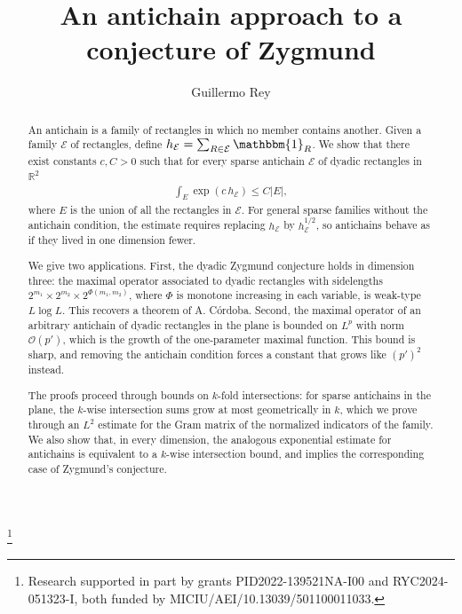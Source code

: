 \documentclass[oneside]{amsart}
\theoremstyle{definition}
\theoremstyle{plain}
\numberwithin{equation}{section}
\numberwithin{theorem}{section}
\newcommand{\ind}{\mathbbm{1}}
\begin{document}
\title{An antichain approach to a conjecture of Zygmund}

\address{Universidad Autónoma de Madrid}
\author{Guillermo Rey}
\thanks{Research supported in part by grants PID2022-139521NA-I00 and
  RYC2024-051323-I, both funded by MICIU/AEI/10.13039/501100011033.}
\maketitle

\begin{abstract}
  An antichain is a family of rectangles in which no member contains another.
  Given a family $\mathcal{E}$ of rectangles, define
  $h_{\mathcal{E}} = \sum_{R \in \mathcal{E}} \ind_R$.
  We show that there exist constants $c, C > 0$ such that for every sparse
  antichain $\mathcal{E}$ of dyadic rectangles in $\mathbb{R}^2$
  \begin{align*}
    \int_E \exp(c\, h_{\mathcal{E}}) \leq C |E|,
  \end{align*}
  where $E$ is the union of all the rectangles in $\mathcal{E}$.
  For general sparse families without the antichain condition, the estimate
  requires replacing $h_{\mathcal{E}}$ by $h_{\mathcal{E}}^{1/2}$,
  so antichains behave as if they lived in one dimension fewer.

  We give two applications.
  First, the dyadic Zygmund conjecture holds in dimension three: the maximal
  operator associated to dyadic rectangles with sidelengths
  $2^{m_1} \times 2^{m_2} \times 2^{\Phi(m_1, m_2)}$, where $\Phi$ is monotone
  increasing in each variable, is weak-type $L\log L$.
  This recovers a theorem of A. Córdoba.
  Second, the maximal operator of an arbitrary antichain of dyadic rectangles
  in the plane is bounded on $L^p$ with norm $\mathcal{O}(p')$, which is the
  growth of the one-parameter maximal function.
  This bound is sharp, and removing the antichain condition forces a constant
  that grows like $(p')^2$ instead.

  The proofs proceed through bounds on $k$-fold intersections: for sparse
  antichains in the plane, the $k$-wise intersection sums grow at most
  geometrically in $k$, which we prove through an $L^2$ estimate for the Gram
  matrix of the normalized indicators of the family.
  We also show that, in every dimension, the analogous exponential estimate
  for antichains is equivalent to a $k$-wise intersection bound, and implies
  the corresponding case of Zygmund's conjecture.
\end{abstract}
\end{document}
